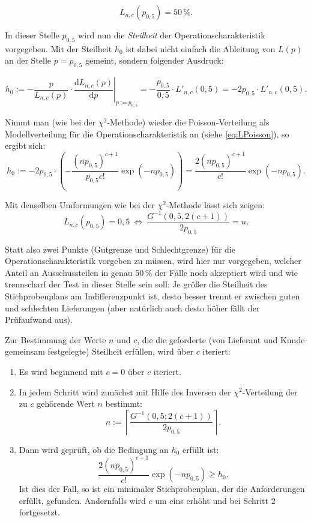 \documentclass[a4paper,11pt,oneside]{article}
\begin{document}
$$
L_{n,c}(p_{0{,}5})=50\,\%.
$$

In dieser Stelle $p_{0{,}5}$ wird nun die \emph{Steilheit} der Operationscharakteristik vorgegeben. Mit der Steilheit $h_0$ ist dabei nicht einfach die Ableitung von $L(p)$ an der Stelle $p=p_{0{,}5}$ gemeint, sondern folgender Ausdruck:

$$
h_0:=
\left.-\frac{p}{L_{n,c}(p)}\cdot\frac{\mathrm{d}L_{n,c}(p)}{\mathrm{d}p}\right|_{p:=p_{0{,}5}}=
-\frac{p_{0{,}5}}{0{,}5}\cdot L'_{n,c}(0{,}5)=
-2p_{0{,}5}\cdot L'_{n,c}(0{,}5).
$$

Nimmt man (wie bei der $\chi^2$-Methode) wieder die Poisson-Verteilung als Modellverteilung für die Operationscharakteristik an (siehe \eqref{eq:LPoisson}), so ergibt sich:
$$
h_0:=
-2p_{0{,}5}\cdot
\left(-\frac{(np_{0{,}5})^{c+1}}{p_{0{,}5}c!}\exp(-np_{0{,}5})\right)=
\frac{2(np_{0{,}5})^{c+1}}{c!}\exp(-np_{0{,}5}).
$$

Mit denselben Umformungen wie bei der $\chi^2$-Methode lässt sich zeigen:
$$
L_{n,c}(p_{0{,}5})=0{,}5 ~\iff~ \frac{G^{-1}(0{,}5,2(c+1))}{2p_{0{,}5}}=n.
$$

Statt also zwei Punkte (Gutgrenze und Schlechtgrenze) für die Operationscharakteristik vorgeben zu müssen, wird hier nur vorgegeben, welcher Anteil an Ausschussteilen in genau 50\,\% der Fälle noch akzeptiert wird und wie trennscharf der Test in dieser Stelle sein soll: Je größer die Steilheit des Stichprobenplans am Indifferenzpunkt ist, desto besser trennt er zwischen guten und schlechten Lieferungen (aber natürlich auch desto höher fällt der Prüfaufwand aus).

Zur Bestimmung der Werte $n$ und $c$, die die geforderte (von Lieferant und Kunde gemeinsam festgelegte) Steilheit erfüllen, wird über $c$ iteriert:

\begin{enumerate}
\item
Es wird beginnend mit $c=0$ über $c$ iteriert.
\item
In jedem Schritt wird zunächst mit Hilfe des Inversen der $\chi^2$-Verteilung der zu $c$ gehörende Wert $n$ bestimmt:
$$
n:=\left\lceil\frac{G^{-1}(0{,}5;2(c+1))}{2p_{0{,}5}}\right\rceil.
$$
\item
Dann wird geprüft, ob die Bedingung an $h_0$ erfüllt ist:
$$\frac{2(np_{0{,}5})^{c+1}}{c!}\exp(-np_{0{,}5})\ge h_0.$$
Ist dies der Fall, so ist ein minimaler Stichprobenplan, der die Anforderungen erfüllt, gefunden. Andernfalls wird $c$ um eins erhöht und bei Schritt 2 fortgesetzt.
\end{enumerate}
\end{document}
